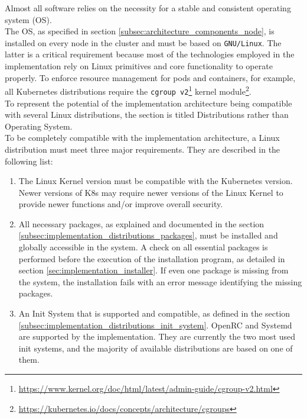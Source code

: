 Almost all software relies on the necessity for a stable and consistent
operating system (OS). \\ %
The OS, as specified in section \ref{subsec:architecture_components_node}, is
installed on every node in the cluster and must be based on \texttt{GNU/Linux}.
The latter is a critical requirement because most of the technologies employed
in the implementation rely on Linux primitives and core functionality to operate
properly. To enforce resource management for pods and containers, for example, all
Kubernetes distributions require the \texttt{cgroup v2}\footnote{\url{https://www.kernel.org/doc/html/latest/admin-guide/cgroup-v2.html}}
kernel module\footnote{\url{https://kubernetes.io/docs/concepts/architecture/cgroups}}.
\\ %
To represent the potential of the implementation architecture being compatible
with several Linux distributions, the section is titled Distributions rather than
Operating System. \\ %
To be completely compatible with the implementation architecture, a Linux
distribution must meet three major requirements. They are described in the following
list:
\begin{enumerate}
  \item The Linux Kernel version must be compatible with the Kubernetes version.
    \newline
    Newer versions of K8s may require newer versions of the Linux Kernel to
    provide newer functions and/or improve overall security.

  \item All necessary packages, as explained and documented in the section
    \ref{subsec:implementation_distributions_packages}, must be installed and globally
    accessible in the system.
    \newline
    A check on all essential packages is performed before the execution of the
    installation program, as detailed in section \ref{sec:implementation_installer}.
    If even one package is missing from the system, the installation fails with an
    error message identifying the missing packages.

  \item An Init System that is supported and compatible, as defined in the
    section \ref{subsec:implementation_distributions_init_system}.
    \newline
    OpenRC and Systemd are supported by the implementation. They are currently
    the two most used init systems, and the majority of available distributions are
    based on one of them.
\end{enumerate}
